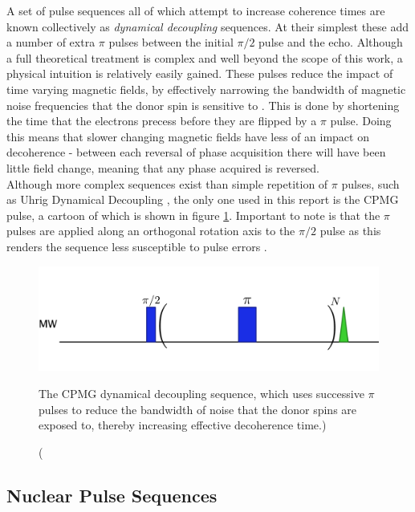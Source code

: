 A set of pulse sequences all of which attempt to increase coherence times are known collectively as \emph{dynamical decoupling} sequences.
At their simplest these add a number of extra $\pi$ pulses between the initial $\pi/2$ pulse and the echo.
Although a full theoretical treatment is complex and well beyond the scope of this work, a physical intuition is relatively easily gained.
These pulses reduce the impact of time varying magnetic fields, by effectively narrowing the bandwidth of magnetic noise frequencies that the donor spin is sensitive to \cite{Wang2009}. 
This is done by shortening the time that the electrons precess before they are flipped by a $\pi$ pulse. 
Doing this means that slower changing magnetic fields have less of an impact on decoherence - between each reversal of phase acquisition there will have been little field change, meaning that any phase acquired is reversed.
\\
Although more complex sequences exist than simple repetition of $\pi$ pulses, such as Uhrig Dynamical Decoupling \cite{Uhrig2008}, the only one used in this report is the CPMG pulse, a cartoon of which is shown in figure \ref{fig:CPMGpulse}.
Important to note is that the $\pi$ pulses are applied along an orthogonal rotation axis to the $\pi/2$ pulse as this renders the sequence less susceptible to pulse errors \cite{Carr1954,Meiboom1958}.


\begin{figure}
\centering
\includegraphics[width=\columnwidth]{Figures/CPMG.pdf}
\caption[CPMG pulse sequence](The CPMG dynamical decoupling sequence, which uses successive $\pi$ pulses to reduce the bandwidth of noise that the donor spins are exposed to, thereby increasing effective decoherence time.)
\label{fig:CPMGpulse}
\end{figure}

\subsection{Nuclear Pulse Sequences}

